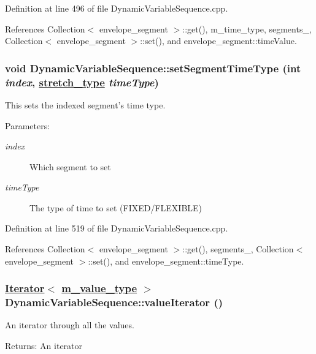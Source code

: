 Definition at line 496 of file Dynamic\-Variable\-Sequence.cpp.

References Collection$<$ envelope\_\-segment $>$::get(), m\_\-time\_\-type, segments\_\-, Collection$<$ envelope\_\-segment $>$::set(), and envelope\_\-segment::time\-Value.\hypertarget{classDynamicVariableSequence_a21}{
\subsubsection[setSegmentTimeType]{\setlength{\rightskip}{0pt plus 5cm}void Dynamic\-Variable\-Sequence::set\-Segment\-Time\-Type (int {\em index}, \hyperlink{Types_8h_a12}{stretch\_\-type} {\em time\-Type})}}
\label{classDynamicVariableSequence_a21}


This sets the indexed segment's time type. \begin{Desc}
\item[Parameters:]
\begin{description}
\item[{\em index}]Which segment to set \item[{\em time\-Type}]The type of time to set (FIXED/FLEXIBLE) \end{description}
\end{Desc}


Definition at line 519 of file Dynamic\-Variable\-Sequence.cpp.

References Collection$<$ envelope\_\-segment $>$::get(), segments\_\-, Collection$<$ envelope\_\-segment $>$::set(), and envelope\_\-segment::time\-Type.\hypertarget{classDynamicVariableSequence_a24}{
\subsubsection[valueIterator]{\setlength{\rightskip}{0pt plus 5cm}\hyperlink{classIterator}{Iterator}$<$ \hyperlink{Types_8h_a3}{m\_\-value\_\-type} $>$ Dynamic\-Variable\-Sequence::value\-Iterator ()}}
\label{classDynamicVariableSequence_a24}


An iterator through all the values. \begin{Desc}
\item[Returns:]An iterator \end{Desc}


